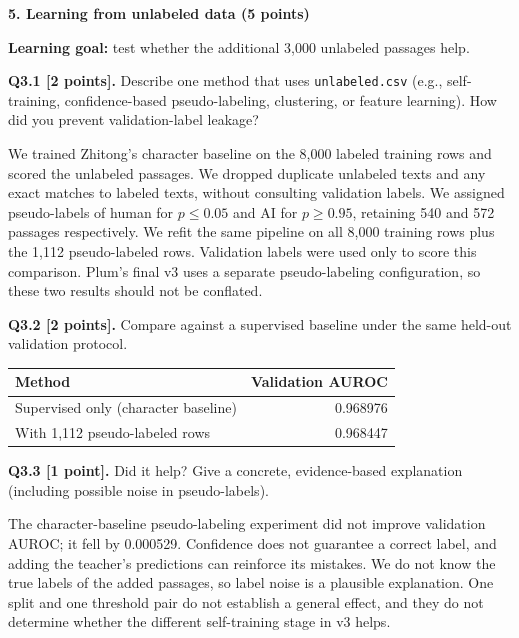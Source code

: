 \documentclass[11pt,letterpaper]{article}
\begin{document}
\vspace{14pt}
{\large\textbf{5. Learning from unlabeled data (5 points)}}
\vspace{2pt}

\textbf{Learning goal:} test whether the additional 3,000 unlabeled passages help.

\vspace{4pt}
\textbf{Q3.1 [2 points].} Describe one method that uses \texttt{unlabeled.csv} (e.g., self-training, confidence-based pseudo-labeling, clustering, or feature learning). How did you prevent validation-label leakage?

We trained Zhitong's character baseline on the 8,000 labeled training rows and scored the unlabeled passages. We dropped duplicate unlabeled texts and any exact matches to labeled texts, without consulting validation labels. We assigned pseudo-labels of human for $p\leq0.05$ and AI for $p\geq0.95$, retaining 540 and 572 passages respectively. We refit the same pipeline on all 8,000 training rows plus the 1,112 pseudo-labeled rows. Validation labels were used only to score this comparison. Plum's final v3 uses a separate pseudo-labeling configuration, so these two results should not be conflated.

\vspace{6pt}
\textbf{Q3.2 [2 points].} Compare against a supervised baseline under the same held-out validation protocol.

\vspace{2pt}
\begin{tabularx}{0.65\textwidth}{@{}Xr@{}}
\toprule
\textbf{Method} & \textbf{Validation AUROC} \\
\midrule
Supervised only (character baseline) & 0.968976 \\
With 1,112 pseudo-labeled rows & 0.968447 \\
\bottomrule
\end{tabularx}

\vspace{6pt}
\textbf{Q3.3 [1 point].} Did it help? Give a concrete, evidence-based explanation (including possible noise in pseudo-labels).

The character-baseline pseudo-labeling experiment did not improve validation AUROC; it fell by 0.000529. Confidence does not guarantee a correct label, and adding the teacher's predictions can reinforce its mistakes. We do not know the true labels of the added passages, so label noise is a plausible explanation. One split and one threshold pair do not establish a general effect, and they do not determine whether the different self-training stage in v3 helps.
\end{document}
